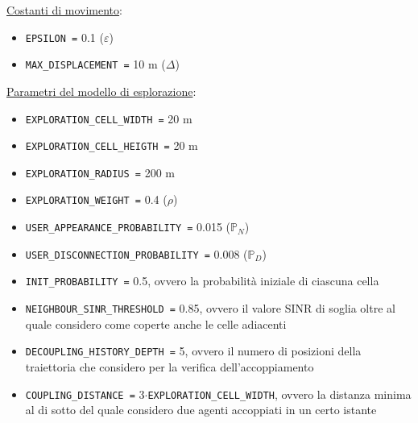 \underline{Costanti di movimento}:
\begin{multicols}{2}
\begin{itemize}

\item \texttt{EPSILON =} 0.1 ($\varepsilon$)

\item \texttt{MAX\_DISPLACEMENT =} 10 m ($\Delta$)

\end{itemize}
\end{multicols}

\underline{Parametri del modello di esplorazione}:
\begin{itemize}

\item \texttt{EXPLORATION\_CELL\_WIDTH =} 20 m

\item \texttt{EXPLORATION\_CELL\_HEIGTH =} 20 m

\item \texttt{EXPLORATION\_RADIUS =} 200 m

\item \texttt{EXPLORATION\_WEIGHT =} 0.4 ($\rho$)

\item \texttt{USER\_APPEARANCE\_PROBABILITY =} 0.015 ($\mathbb{P}_N$)

\item \texttt{USER\_DISCONNECTION\_PROBABILITY =} 0.008 ($\mathbb{P}_D$)

\item \texttt{INIT\_PROBABILITY =} 0.5, ovvero la probabilità iniziale di ciascuna cella

\item \texttt{NEIGHBOUR\_SINR\_THRESHOLD =} 0.85, ovvero il valore SINR di soglia oltre al quale considero come coperte anche le celle adiacenti

\item \texttt{DECOUPLING\_HISTORY\_DEPTH =} 5, ovvero il numero di posizioni della traiettoria che considero per la verifica dell'accoppiamento

\item \texttt{COUPLING\_DISTANCE =} 3$\cdot$\texttt{EXPLORATION\_CELL\_WIDTH}, ovvero la distanza minima al di sotto del quale considero due agenti accoppiati in un certo istante

\end{itemize}
